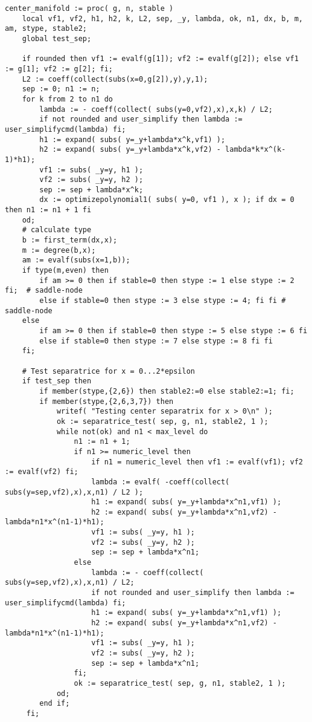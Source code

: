 \documentclass[a4paper,10pt]{article}
\begin{document}
\begin{lstlisting}[name=type]
center_manifold := proc( g, n, stable )
    local vf1, vf2, h1, h2, k, L2, sep, _y, lambda, ok, n1, dx, b, m, am, stype, stable2;
    global test_sep;

    if rounded then vf1 := evalf(g[1]); vf2 := evalf(g[2]); else vf1 := g[1]; vf2 := g[2]; fi;
    L2 := coeff(collect(subs(x=0,g[2]),y),y,1);
    sep := 0; n1 := n;
    for k from 2 to n1 do
        lambda := - coeff(collect( subs(y=0,vf2),x),x,k) / L2;
        if not rounded and user_simplify then lambda := user_simplifycmd(lambda) fi;
        h1 := expand( subs( y=_y+lambda*x^k,vf1) );
        h2 := expand( subs( y=_y+lambda*x^k,vf2) - lambda*k*x^(k-1)*h1);
        vf1 := subs( _y=y, h1 );
        vf2 := subs( _y=y, h2 );
        sep := sep + lambda*x^k;
        dx := optimizepolynomial1( subs( y=0, vf1 ), x ); if dx = 0 then n1 := n1 + 1 fi
    od;
    # calculate type
    b := first_term(dx,x);
    m := degree(b,x);
    am := evalf(subs(x=1,b));
    if type(m,even) then
        if am >= 0 then if stable=0 then stype := 1 else stype := 2 fi;  # saddle-node
        else if stable=0 then stype := 3 else stype := 4; fi fi # saddle-node
    else
        if am >= 0 then if stable=0 then stype := 5 else stype := 6 fi
        else if stable=0 then stype := 7 else stype := 8 fi fi
    fi;

    # Test separatrice for x = 0...2*epsilon
    if test_sep then
        if member(stype,{2,6}) then stable2:=0 else stable2:=1; fi;
        if member(stype,{2,6,3,7}) then
            writef( "Testing center separatrix for x > 0\n" );
            ok := separatrice_test( sep, g, n1, stable2, 1 );
            while not(ok) and n1 < max_level do
                n1 := n1 + 1;
                if n1 >= numeric_level then
                    if n1 = numeric_level then vf1 := evalf(vf1); vf2 := evalf(vf2) fi;
                    lambda := evalf( -coeff(collect( subs(y=sep,vf2),x),x,n1) / L2 );
                    h1 := expand( subs( y=_y+lambda*x^n1,vf1) );
                    h2 := expand( subs( y=_y+lambda*x^n1,vf2) - lambda*n1*x^(n1-1)*h1);
                    vf1 := subs( _y=y, h1 );
                    vf2 := subs( _y=y, h2 );
                    sep := sep + lambda*x^n1;
                else
                    lambda := - coeff(collect( subs(y=sep,vf2),x),x,n1) / L2;
                    if not rounded and user_simplify then lambda := user_simplifycmd(lambda) fi;
                    h1 := expand( subs( y=_y+lambda*x^n1,vf1) );
                    h2 := expand( subs( y=_y+lambda*x^n1,vf2) - lambda*n1*x^(n1-1)*h1);
                    vf1 := subs( _y=y, h1 );
                    vf2 := subs( _y=y, h2 );
                    sep := sep + lambda*x^n1;
                fi;
                ok := separatrice_test( sep, g, n1, stable2, 1 );
            od;
        end if;
     fi;


\end{lstlisting}
\end{document}
